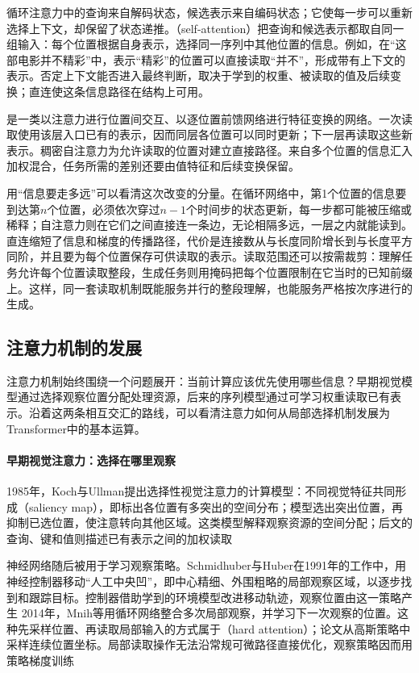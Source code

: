 循环注意力中的查询来自解码状态，候选表示来自编码状态；它使每一步可以重新选择上下文，却保留了状态递推。（self-attention）把查询和候选表示都取自同一组输入：每个位置根据自身表示，选择同一序列中其他位置的信息。例如，在“这部电影并不精彩”中，表示“精彩”的位置可以直接读取“并不”，形成带有上下文的表示。否定上下文能否进入最终判断，取决于学到的权重、被读取的值及后续变换；直连使这条信息路径在结构上可用。

是一类以注意力进行位置间交互、以逐位置前馈网络进行特征变换的网络。一次读取使用该层入口已有的表示，因而同层各位置可以同时更新；下一层再读取这些新表示。稠密自注意力为允许读取的位置对建立直接路径。来自多个位置的信息汇入加权混合，任务所需的差别还要由值特征和后续变换保留。

用“信息要走多远”可以看清这次改变的分量。在循环网络中，第1个位置的信息要到达第$n$个位置，必须依次穿过$n-1$个时间步的状态更新，每一步都可能被压缩或稀释；自注意力则在它们之间直接连一条边，无论相隔多远，一层之内就能读到。直连缩短了信息和梯度的传播路径，代价是连接数从与长度同阶增长到与长度平方同阶，并且要为每个位置保存可供读取的表示。读取范围还可以按需裁剪：理解任务允许每个位置读取整段，生成任务则用掩码把每个位置限制在它当时的已知前缀上。这样，同一套读取机制既能服务并行的整段理解，也能服务严格按次序进行的生成。

\subsection{注意力机制的发展}
\label{sec:transformer-attention-history}

注意力机制始终围绕一个问题展开：当前计算应该优先使用哪些信息？早期视觉模型通过选择观察位置分配处理资源，后来的序列模型通过可学习权重读取已有表示。沿着这两条相互交汇的路线，可以看清注意力如何从局部选择机制发展为Transformer中的基本运算。

\paragraph{早期视觉注意力：选择在哪里观察}
1985年，Koch与Ullman提出选择性视觉注意力的计算模型：不同视觉特征共同形成（saliency map），即标出各位置有多突出的空间分布；模型选出突出位置，再抑制已选位置，使注意转向其他区域。这类模型解释观察资源的空间分配；后文的查询、键和值则描述已有表示之间的加权读取

神经网络随后被用于学习观察策略。Schmidhuber与Huber在1991年的工作中，用神经控制器移动“人工中央凹”，即中心精细、外围粗略的局部观察区域，以逐步找到和跟踪目标。控制器借助学到的环境模型改进移动轨迹，观察位置由这一策略产生 2014年，Mnih等用循环网络整合多次局部观察，并学习下一次观察的位置。这种先采样位置、再读取局部输入的方式属于（hard attention）；论文从高斯策略中采样连续位置坐标。局部读取操作无法沿常规可微路径直接优化，观察策略因而用策略梯度训练

